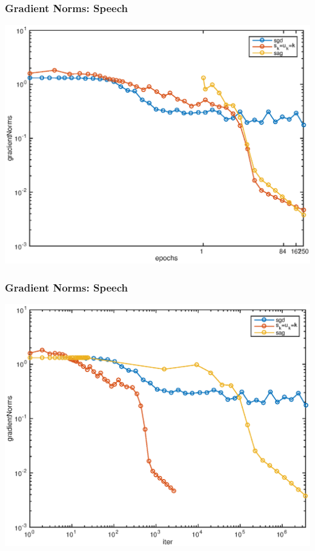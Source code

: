 \documentclass{beamer}
\begin{document}
\begin{frame}
	\frametitle{Gradient Norms: Speech}
	\begin{center}
			\includegraphics[scale=0.5]{figA.eps}
	\end{center}
\end{frame}

\begin{frame}
	\frametitle{Gradient Norms: Speech}
	\begin{center}
			\includegraphics[scale=0.5]{kk.eps}
	\end{center}
\end{frame}
\end{document}
